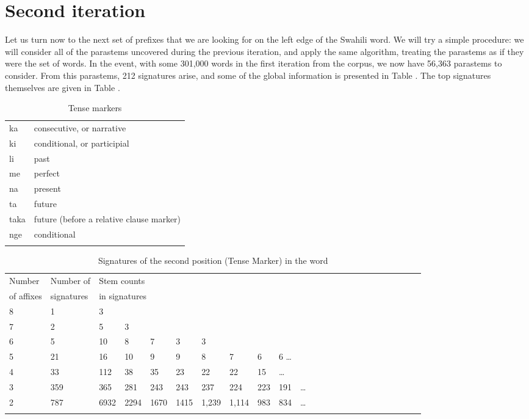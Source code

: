 \documentclass[output=paper,colorlinks,citecolor=brown]{langscibook}
\begin{document}
\section{Second iteration}

Let us turn now to the next set of prefixes that we are looking for on the left edge of the Swahili word. We will try a simple procedure: we will consider all of the parastems uncovered during the previous iteration, and apply the same algorithm, treating the parastems as if they were the set of words. In the event, with some 301,000 words in the first iteration from the corpus, we now have 56,363 parastems to consider. From this parastems, 212 signatures arise, and some of the global information is presented in Table . The top signatures themselves are given in Table .


\begin{table}
\begin{center}
\begin{tabular}{ll}\lsptoprule
ka &  consecutive, or narrative \\
ki&  conditional, or participial  \\
li&  past \\
me& perfect  \\
na&  present  \\
ta & future \\
taka&  future (before a relative clause marker) \\
nge & conditional \\\lspbottomrule
\end{tabular}
\caption{Tense markers}
\label{TMs}
\end{center}
\end{table} 

\begin{table}[!htbp]
\begin{tabular}{llllllllllllllllllllllll} \lsptoprule
Number  &  Number of  & \multicolumn{8}{l}{Stem counts } \\
 of affixes &   signatures & \multicolumn{8}{l}{in signatures} \\ \midrule
8 & 1 & 3  \\
7 & 2 & 5 & 3 \\
6 & 5 & 10 & 8 & 7 & 3 & 3 \\
5 & 21 & 16 & 10 &  9 &  9 &  8 & 7 & 6 &  6   \ldots \\
4 & 33 & 112 & 38 & 35 & 23 & 22 & 22 & 15 &  \ldots\\
3 & 359 & 365 & 281 & 243 & 243 & 237  & 224 & 223 & 191 &  \ldots\\
2 &  787 &6932& 2294 & 1670 & 1415 & 1,239 & 1,114 & 983 & 834  & \ldots \\ \lspbottomrule
\end{tabular}
\caption{Signatures of the second position (Tense Marker) in the word}
\label{TM-table}
\end{table}
\end{document}
